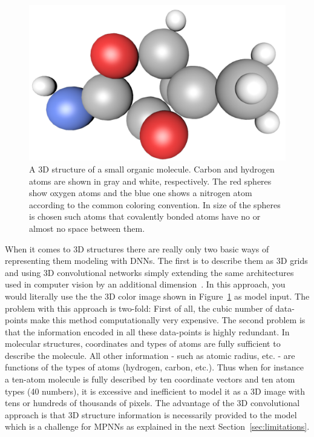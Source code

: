 \begin{figure}[H]
	\centering
	\includegraphics[width=\linewidth]{figures/molecule-3d-1}
	\caption{A 3D structure of a small organic molecule. Carbon and hydrogen atoms are shown in gray and white, respectively. The red spheres show oxygen atoms and the blue one shows a nitrogen atom according to the common coloring convention. In size of the spheres is chosen such atoms that covalently bonded atoms have no or almost no space between them. 
	}
	\label{fig:molecule-3d}
\end{figure}

When it comes to 3D structures there are really only two basic ways of representing them modeling with DNNs. The first is to describe them as 3D grids and using 3D convolutional networks simply extending the same architectures used in computer vision by an additional dimension~\cite{Wallach2015}. In this approach, you would literally use the the 3D color image shown in Figure~\ref{fig:molecule-3d} as model input. The problem with this approach is two-fold: First of all, the cubic number of data-points make this method computationally very expensive. The second problem is that the information encoded in all these data-points is highly redundant. In molecular structures, coordinates and types of atoms are fully sufficient to describe the molecule. All other information - such as atomic radius, etc. - are functions of the types of atoms (hydrogen, carbon, etc.). Thus when for instance a ten-atom molecule is fully described by ten coordinate vectors and ten atom types (40 numbers), it is excessive and inefficient to model it as a 3D image with tens or hundreds of thousands of pixels. The advantage of the 3D convolutional approach is that 3D structure information is necessarily provided to the model which is a challenge for MPNNs as explained in the next Section~\ref{sec:limitations}.



